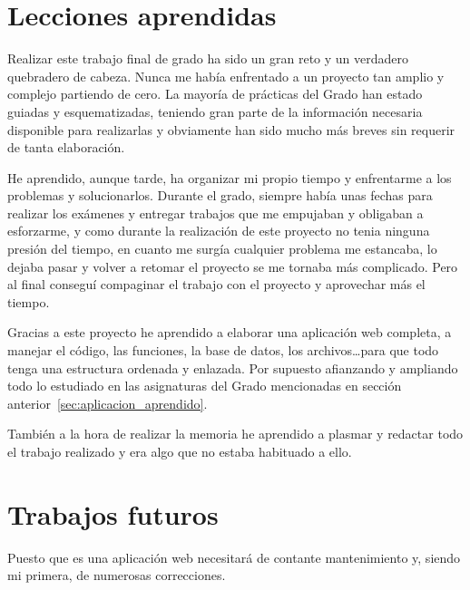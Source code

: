 \documentclass[a4paper, 12pt]{book}
\begin{document}
\section{Lecciones aprendidas}
\label{sec:lecciones_aprendidas}

Realizar este trabajo final de grado ha sido un gran reto y un verdadero quebradero de cabeza. 
Nunca me había enfrentado a un proyecto tan amplio y complejo partiendo de cero.
La mayoría de prácticas del Grado han estado guiadas y esquematizadas, teniendo gran parte de la información necesaria disponible para realizarlas y obviamente han sido mucho más breves sin requerir de tanta elaboración.

\vspace{5mm}
He aprendido, aunque tarde, ha organizar mi propio tiempo y enfrentarme a los problemas y solucionarlos.
Durante el grado, siempre había unas fechas para realizar los exámenes y entregar trabajos que me empujaban y obligaban a esforzarme, y como durante la realización de este proyecto no tenia ninguna presión del tiempo, en cuanto me surgía cualquier problema me estancaba, lo dejaba pasar y volver a retomar el proyecto se me tornaba más complicado. 
Pero al final conseguí compaginar el trabajo con el proyecto y aprovechar más el tiempo.

\vspace{5mm}
Gracias a este proyecto he aprendido a elaborar una aplicación web completa, a manejar el código, las funciones, la base de datos, los archivos…para que todo tenga una estructura ordenada y enlazada. Por supuesto afianzando y ampliando todo lo estudiado en las asignaturas del Grado mencionadas en sección anterior~\ref{sec:aplicacion_aprendido}.

\vspace{5mm}
También a la hora de realizar la memoria he aprendido a plasmar y redactar todo el trabajo realizado y era algo que no estaba habituado a ello.

\section{Trabajos futuros}
\label{sec:trabajos_futuros}

Puesto que es una aplicación web necesitará de contante mantenimiento y, siendo mi primera, de numerosas correcciones.
\end{document}
